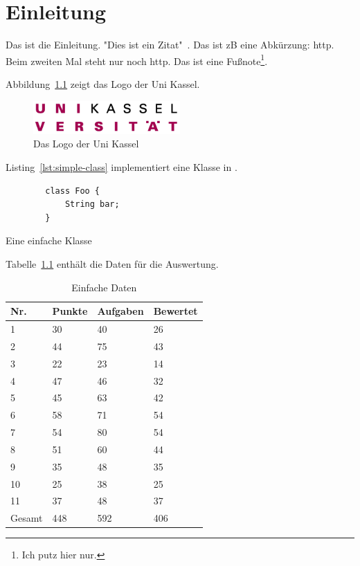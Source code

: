 \chapter{Einleitung}\label{ch:introduction}

Das ist die Einleitung.
"Dies ist ein Zitat"~\cite{dragon-book}.
Das ist \ac{zB} eine Abkürzung: \ac{http}.
Beim zweiten Mal steht nur noch \ac{http}.
Das ist eine Fußnote\footnote{Ich putz hier nur.}.

Abbildung~\ref{fig:uni-kassel-logo} zeigt das Logo der Uni Kassel.

\begin{figure}[htp] %
    \centering
    \includegraphics[width=0.5\textwidth]{images/Logo_UniKassel.png} %
    \caption{Das Logo der Uni Kassel}
    \label{fig:uni-kassel-logo}
\end{figure}

Listing~\ref{lst:simple-class} implementiert eine Klasse in .

\begin{listing}[htp]
    \begin{verbatim}
        class Foo {
            String bar;
        }
    \end{verbatim}
    \caption{Eine einfache Klasse}
    \label{lst:simple-class}
\end{listing}

Tabelle~\ref{tbl:evaluation-data} enthält die Daten für die Auswertung.

\begin{table}[htp]
    \centering
    \caption{Einfache Daten}
    \begin{tabular}{|l|l|l|l|}
        \hline
        Nr.    & Punkte & Aufgaben & Bewertet \\
        \hline
        1      & 30     & 40       & 26       \\
        2      & 44     & 75       & 43       \\
        3      & 22     & 23       & 14       \\
        4      & 47     & 46       & 32       \\
        5      & 45     & 63       & 42       \\
        6      & 58     & 71       & 54       \\
        7      & 54     & 80       & 54       \\
        8      & 51     & 60       & 44       \\
        9      & 35     & 48       & 35       \\
        10     & 25     & 38       & 25       \\
        11     & 37     & 48       & 37       \\
        \hline
        Gesamt & 448    & 592      & 406      \\
        \hline
    \end{tabular}
    \label{tbl:evaluation-data}
\end{table}

